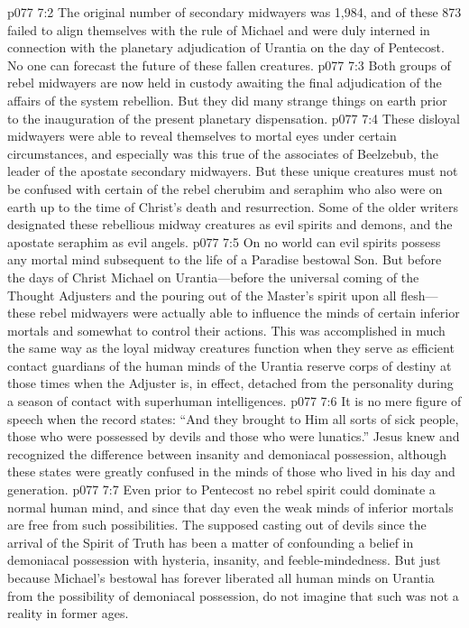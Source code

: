 \vs p077 7:2 The original number of secondary midwayers was 1,984, and of these 873 failed to align themselves with the rule of Michael and were duly interned in connection with the planetary adjudication of Urantia on the day of Pentecost. No one can forecast the future of these fallen creatures.
\vs p077 7:3 Both groups of rebel midwayers are now held in custody awaiting the final adjudication of the affairs of the system rebellion. But they did many strange things on earth prior to the inauguration of the present planetary dispensation.
\vs p077 7:4 These disloyal midwayers were able to reveal themselves to mortal eyes under certain circumstances, and especially was this true of the associates of Beelzebub, the leader of the apostate secondary midwayers. But these unique creatures must not be confused with certain of the rebel cherubim and seraphim who also were on earth up to the time of Christ’s death and resurrection. Some of the older writers designated these rebellious midway creatures as evil spirits and demons, and the apostate seraphim as evil angels.
\vs p077 7:5 On no world can evil spirits possess any mortal mind subsequent to the life of a Paradise bestowal Son. But before the days of Christ Michael on Urantia---before the universal coming of the Thought Adjusters and the pouring out of the Master’s spirit upon all flesh---these rebel midwayers were actually able to influence the minds of certain inferior mortals and somewhat to control their actions. This was accomplished in much the same way as the loyal midway creatures function when they serve as efficient contact guardians of the human minds of the Urantia reserve corps of destiny at those times when the Adjuster is, in effect, detached from the personality during a season of contact with superhuman intelligences.
\vs p077 7:6 It is no mere figure of speech when the record states: “And they brought to Him all sorts of sick people, those who were possessed by devils and those who were lunatics.” Jesus knew and recognized the difference between insanity and demoniacal possession, although these states were greatly confused in the minds of those who lived in his day and generation.
\vs p077 7:7 Even prior to Pentecost no rebel spirit could dominate a normal human mind, and since that day even the weak minds of inferior mortals are free from such possibilities. The supposed casting out of devils since the arrival of the Spirit of Truth has been a matter of confounding a belief in demoniacal possession with hysteria, insanity, and feeble\hyp{}mindedness. But just because Michael’s bestowal has forever liberated all human minds on Urantia from the possibility of demoniacal possession, do not imagine that such was not a reality in former ages.
